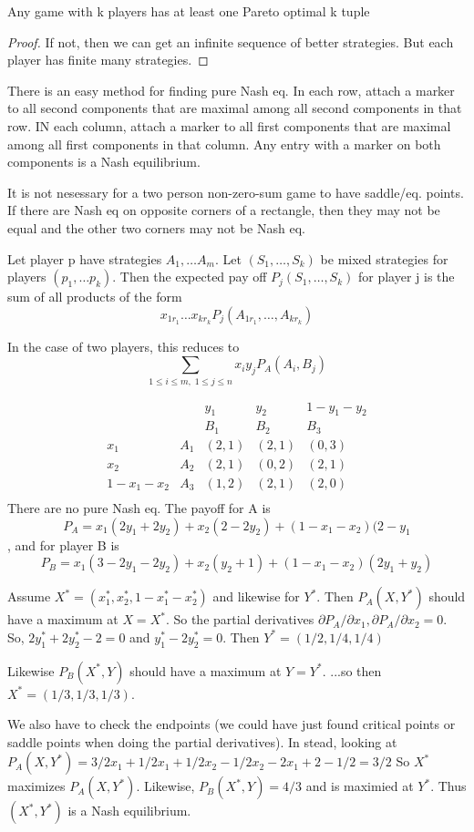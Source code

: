 \begin{theorem}
Any game with k players has at least one Pareto optimal k tuple
\end{theorem}

\begin{proof}
If not, then we can get an infinite sequence of better strategies. But each player has finite many strategies. 
\end{proof}

There is an easy method for finding pure Nash eq.  In each row, attach a marker to all second components that are maximal among all second components in that row. IN each column, attach a marker to all first components that are maximal among all first components in that column. Any entry with a marker on both components is a Nash equilibrium. 

It is not nesessary for a two person non-zero-sum game to have saddle/eq. points. If there are Nash eq on opposite corners of a rectangle, then they may not be equal and the other two corners may not be Nash eq.

Let player p have strategies $A_1, \dots A_m$. Let $(S_1, \dots, S_k)$ be mixed strategies for players $(p_1, \dots p_k)$. Then the expected pay off $P_j(S_1, \dots, S_k)$ for player j is the sum of all products of the form
\[x_{1r_1}\dots x_{kr_k} P_j(A_{1r_1},\dots,A_{kr_k})\]

In the case of two players, this reduces to
\[\sum_{1\leq i \leq m, \; 1\leq j \leq n} x_i y_j P_A(A_i, B_j)\]


\begin{example}
\[
\begin{matrix}
	&	&	y_1	& y_2	&1-y_1-y_2 \\
	&	&	B_1	& B_2	&B_3	\\
x_1	&A_1& (2,1) & (2,1)  &(0,3) \\
x_2 &A_2& (2,1) & (0,2)  & (2,1) \\
1-x_1-x_2&A_3&(1,2)&(2,1)&(2,0)\\
\end{matrix}
\]
There are no pure Nash eq. The payoff for A is 
\[P_A=x_1(2y_1+2y_2)+x_2(2-2y_2)+(1-x_1-x_2)(2-y_1\], and for player B is
\[P_B=x_1(3-2y_1-2y_2)+x_2(y_2+1)+(1-x_1-x_2)(2y_1+y_2)\]

Assume $X^*=(x_1^*,x_2^*,1-x_1^*-x_2^*)$ and likewise for $Y^*$. Then $P_A(X,Y^*)$ should have a maximum at $X=X^*$. So the partial derivatives $\partial P_A/\partial x_1, \partial P_A/\partial x_2 =0$. So, $2y_1^*+2y_2^*-2=0$ and $y_1^*-2y_2^*=0$. Then $Y^*=(1/2,1/4,1/4)$

Likewise $P_B(X^*,Y)$ should have a maximum at $Y=Y^*$. ...so then $X^*=(1/3,1/3,1/3)$. 

We also have to check the endpoints (we could have just found critical points or saddle points when doing the partial derivatives). In stead, looking at $P_A(X,Y^*)=3/2x_1+1/2x_1+1/2x_2-1/2x_2-2x_1+2-1/2=3/2$ So $X^*$ maximizes $P_A(X,Y^*)$. Likewise, $P_B(X^*,Y)=4/3$ and is maximied at $Y^*$. Thus $(X^*,Y^*)$ is a Nash equilibrium. 
\end{example}


